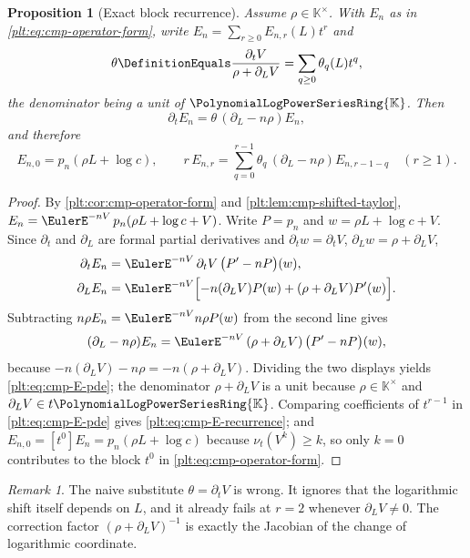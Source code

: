 \documentclass[11pt,oneside]{article}
\theoremstyle{plain}
\newtheorem{proposition}[theorem]{Proposition}
\theoremstyle{definition}
\theoremstyle{remark}
\newtheorem{remark}[theorem]{Remark}
\newcommand{\K}{\mathbb{K}}
\newcommand{\PLpow}{\PolynomialLogPowerSeriesRing{\K}}   %
\newcommand{\ordt}{\nu_{t}}                              %
\begin{document}
\begin{proposition}[Exact block recurrence]\label{plt:prop:cmp-block-recurrence}
Assume \(\rho\in\K^\times\).  With \(E_n\) as in
\eqref{plt:eq:cmp-operator-form}, write
\(E_n=\sum_{r\ge0}E_{n,r}(L)t^{r}\) and
\begin{equation}\label{plt:eq:cmp-theta-def}
 \theta\DefinitionEquals
 \frac{\partial_tV}{\rho+\partial_LV}
 =\sum_{q\ge0}\theta_q(L)t^{q},
\end{equation}
the denominator being a unit of \(\PLpow\).  Then
\begin{equation}\label{plt:eq:cmp-E-pde}
 \partial_tE_n=\theta\,(\partial_L-n\rho)E_n,
\end{equation}
and therefore
\begin{equation}\label{plt:eq:cmp-E-recurrence}
 E_{n,0}=p_n(\rho L+\log c),
 \qquad
 r\,E_{n,r}
 =\sum_{q=0}^{r-1}\theta_q\,(\partial_L-n\rho)E_{n,r-1-q}
 \quad(r\ge1).
\end{equation}
\end{proposition}

\begin{proof}
By \cref{plt:cor:cmp-operator-form} and \cref{plt:lem:cmp-shifted-taylor},
\(E_n=\EulerE^{-nV}\,p_n(\rho L+\log c+V)\).  Write \(P=p_n\) and
\(w=\rho L+\log c+V\).  Since \(\partial_t\) and \(\partial_L\) are formal
partial derivatives and \(\partial_tw=\partial_tV\),
\(\partial_Lw=\rho+\partial_LV\),
\begin{align*}
 \partial_tE_n
 &=\EulerE^{-nV}\,\partial_tV\,\bigl(P'-nP\bigr)(w),\\
 \partial_LE_n
 &=\EulerE^{-nV}\Bigl[-n(\partial_LV)P(w)+(\rho+\partial_LV)P'(w)\Bigr].
\end{align*}
Subtracting \(n\rho E_n=\EulerE^{-nV}n\rho P(w)\) from the second line gives
\[
 (\partial_L-n\rho)E_n
 =\EulerE^{-nV}\,(\rho+\partial_LV)\,\bigl(P'-nP\bigr)(w),
\]
because \(-n(\partial_LV)-n\rho=-n(\rho+\partial_LV)\).  Dividing the two
displays yields \eqref{plt:eq:cmp-E-pde}; the denominator
\(\rho+\partial_LV\) is a unit because \(\rho\in\K^\times\) and
\(\partial_LV\in t\PLpow\).  Comparing coefficients of \(t^{r-1}\) in
\eqref{plt:eq:cmp-E-pde} gives \eqref{plt:eq:cmp-E-recurrence}; and
\(E_{n,0}=[t^{0}]E_n=p_n(\rho L+\log c)\) because \(\ordt(V^{k})\ge k\), so
only \(k=0\) contributes to the block \(t^{0}\) in
\eqref{plt:eq:cmp-operator-form}.
\end{proof}

\begin{remark}
The naive substitute \(\theta=\partial_tV\) is wrong.  It ignores that the
logarithmic shift itself depends on \(L\), and it already fails at \(r=2\)
whenever \(\partial_LV\ne0\).  The correction factor
\((\rho+\partial_LV)^{-1}\) is exactly the Jacobian of the change of
logarithmic coordinate.
\end{remark}
\end{document}
